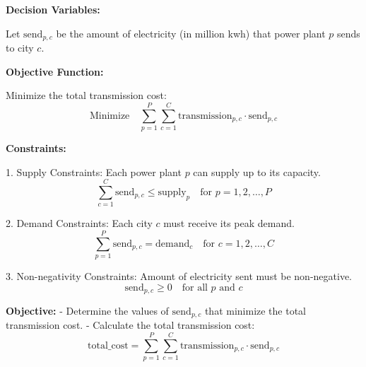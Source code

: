 \documentclass{article}
\begin{document}
\textbf{Decision Variables:}

Let \( \text{send}_{p,c} \) be the amount of electricity (in million kwh) that power plant \( p \) sends to city \( c \).

\textbf{Objective Function:}

Minimize the total transmission cost:
\[
\text{Minimize} \quad \sum_{p=1}^{P} \sum_{c=1}^{C} \text{transmission}_{p,c} \cdot \text{send}_{p,c}
\]

\textbf{Constraints:}

1. Supply Constraints: Each power plant \( p \) can supply up to its capacity.
\[
\sum_{c=1}^{C} \text{send}_{p,c} \leq \text{supply}_{p} \quad \text{for } p = 1, 2, \ldots, P
\]

2. Demand Constraints: Each city \( c \) must receive its peak demand.
\[
\sum_{p=1}^{P} \text{send}_{p,c} = \text{demand}_{c} \quad \text{for } c = 1, 2, \ldots, C
\]

3. Non-negativity Constraints: Amount of electricity sent must be non-negative.
\[
\text{send}_{p,c} \geq 0 \quad \text{for all } p \text{ and } c
\]

\textbf{Objective:}
- Determine the values of \( \text{send}_{p,c} \) that minimize the total transmission cost.
- Calculate the total transmission cost:
\[
\text{total\_cost} = \sum_{p=1}^{P} \sum_{c=1}^{C} \text{transmission}_{p,c} \cdot \text{send}_{p,c}
\]
\end{document}

